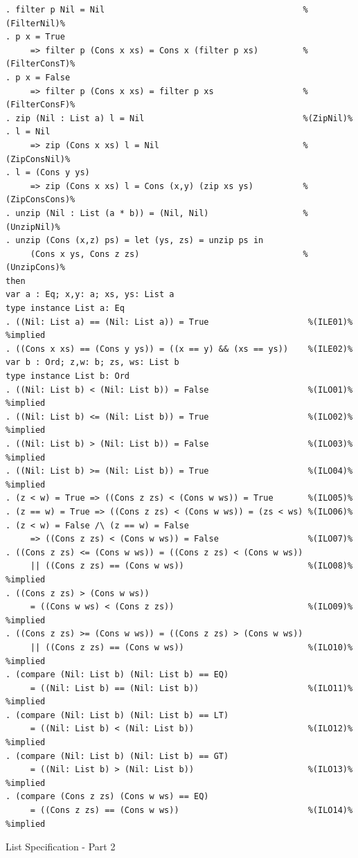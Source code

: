 \documentclass[12pt,twoside]{article}
\numberwithin{spec}{subsection}
\numberwithin{proof}{subsection}
\numberwithin{figure}{subsection}
\numberwithin{code}{subsection}
\begin{document}
\addtocounter{spec}{-1}
\begin{spec}
\begin{verbatim}
. filter p Nil = Nil                                        %(FilterNil)%
. p x = True 
     => filter p (Cons x xs) = Cons x (filter p xs)         %(FilterConsT)%
. p x = False 
     => filter p (Cons x xs) = filter p xs                  %(FilterConsF)%
. zip (Nil : List a) l = Nil                                %(ZipNil)%
. l = Nil 
     => zip (Cons x xs) l = Nil                             %(ZipConsNil)%
. l = (Cons y ys) 
     => zip (Cons x xs) l = Cons (x,y) (zip xs ys)          %(ZipConsCons)%
. unzip (Nil : List (a * b)) = (Nil, Nil)                   %(UnzipNil)%
. unzip (Cons (x,z) ps) = let (ys, zs) = unzip ps in
     (Cons x ys, Cons z zs)                                 %(UnzipCons)%
then
var a : Eq; x,y: a; xs, ys: List a
type instance List a: Eq
. ((Nil: List a) == (Nil: List a)) = True                    %(ILE01)% %implied
. ((Cons x xs) == (Cons y ys)) = ((x == y) && (xs == ys))    %(ILE02)%
var b : Ord; z,w: b; zs, ws: List b
type instance List b: Ord
. ((Nil: List b) < (Nil: List b)) = False                    %(ILO01)% %implied
. ((Nil: List b) <= (Nil: List b)) = True                    %(ILO02)% %implied
. ((Nil: List b) > (Nil: List b)) = False                    %(ILO03)% %implied
. ((Nil: List b) >= (Nil: List b)) = True                    %(ILO04)% %implied
. (z < w) = True => ((Cons z zs) < (Cons w ws)) = True       %(ILO05)%
. (z == w) = True => ((Cons z zs) < (Cons w ws)) = (zs < ws) %(ILO06)%
. (z < w) = False /\ (z == w) = False
     => ((Cons z zs) < (Cons w ws)) = False                  %(ILO07)%
. ((Cons z zs) <= (Cons w ws)) = ((Cons z zs) < (Cons w ws)) 
     || ((Cons z zs) == (Cons w ws))                         %(ILO08)% %implied
. ((Cons z zs) > (Cons w ws))
     = ((Cons w ws) < (Cons z zs))                           %(ILO09)% %implied
. ((Cons z zs) >= (Cons w ws)) = ((Cons z zs) > (Cons w ws)) 
     || ((Cons z zs) == (Cons w ws))                         %(ILO10)% %implied
. (compare (Nil: List b) (Nil: List b) == EQ)
     = ((Nil: List b) == (Nil: List b))                      %(ILO11)% %implied
. (compare (Nil: List b) (Nil: List b) == LT)
     = ((Nil: List b) < (Nil: List b))                       %(ILO12)% %implied
. (compare (Nil: List b) (Nil: List b) == GT)
     = ((Nil: List b) > (Nil: List b))                       %(ILO13)% %implied
. (compare (Cons z zs) (Cons w ws) == EQ)
     = ((Cons z zs) == (Cons w ws))                          %(ILO14)% %implied
\end{verbatim}
\caption{List Specification - Part 2}
\end{spec}
\end{document}
